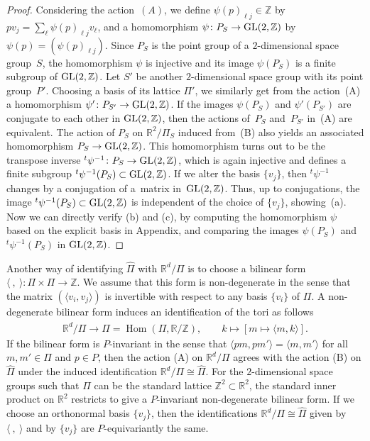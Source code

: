 \documentclass[pdftex]{sigma}
\theoremstyle{definition}
\newcommand{\R}{\mathbb{R}}
\newcommand{\Z}{\mathbb{Z}}
\begin{document}
\begin{proof}Considering the action~$(A)$, we def\/ine $\psi(p)_{\ell j} \in \Z$ by $pv_j = \sum_{\ell} \psi(p)_{\ell j}v_{\ell}$, and a homomorphism $\psi\colon P_S \to {\rm GL}(2, \Z)$ by $\psi(p) = (\psi(p)_{\ell j})$. Since $P_S$ is the point group of a $2$-dimensional space group~$S$, the homomorphism $\psi$ is injective and its image $\psi(P_S)$ is a f\/inite subgroup of ${\rm GL}(2, \Z)$. Let $S'$ be another $2$-dimensional space group with its point group~$P'$. Choosing a basis of its lattice $\Pi'$, we similarly get from the action~(A) a homomorphism $\psi'\colon P_{S'} \to {\rm GL}(2, \Z)$. If the images $\psi(P_S)$ and $\psi'(P_{S'})$ are conjugate to each other in ${\rm GL}(2, \Z)$, then the actions of~$P_S$ and~$P_{S'}$ in~(A) are equivalent. The action of $P_S$ on $\R^2/\Pi_S$ induced from~(B) also yields an associated homomorphism $P_S \to {\rm GL}(2, \Z)$. This homomorphism turns out to be the transpose inverse ${}^t \psi^{-1} \colon P_S \to {\rm GL}(2, \Z)$, which is again injective and def\/ines a f\/inite subgroup ${}^t\psi^{-1}(P_S) \subset {\rm GL}(2, \Z)$. If we alter the basis $\{ v_j \}$, then ${}^t\psi^{-1}$ changes by a conjugation of a~matrix in~${\rm GL}(2, \Z)$. Thus, up to conjugations, the image ${}^t\psi^{-1}(P_S) \subset {\rm GL}(2, \Z)$ is independent of the choice of $\{ v_j \}$, showing~(a). Now we can directly verify (b) and (c), by computing the homomorphism $\psi$ based on the explicit basis in Appendix, and comparing the images $\psi(P_S)$ and ${}^t\psi^{-1}(P_S)$ in ${\rm GL}(2, \Z)$.
\end{proof}

Another way of identifying $\hat{\Pi}$ with $\R^d/\Pi$ is to choose a bilinear form $\langle \ , \ \rangle \colon \Pi \times \Pi \to \Z$. We assume that this form is non-degenerate in the sense that the matrix $(\langle v_i, v_j \rangle)$ is invertible with respect to any basis $\{ v_i \}$ of $\Pi$. A non-degenerate bilinear form induces an identif\/ication of the tori as follows
\begin{gather*}
 \R^d/\Pi \longrightarrow \hat{\Pi} = \operatorname{Hom}(\Pi, \R/\Z), \qquad k \mapsto [m \mapsto \langle m, k \rangle].
\end{gather*}
If the bilinear form is $P$-invariant in the sense that $\langle p m, p m' \rangle = \langle m, m' \rangle$ for all $m, m' \in \Pi$ and $p \in P$, then the action (A) on $\R^d/\Pi$ agrees with the action (B) on $\hat{\Pi}$ under the induced identif\/ication $\R^d/\Pi \cong \hat{\Pi}$. For the $2$-dimensional space groups such that $\Pi$ can be the standard lattice $\Z^2 \subset \R^2$, the standard inner product on $\R^2$ restricts to give a $P$-invariant non-degenerate bilinear form. If we choose an orthonormal basis $\{ v_j \}$, then the identif\/ications $\R^d/\Pi \cong \hat{\Pi}$ given by $\langle \ , \ \rangle$ and by $\{ v_j \}$ are $P$-equivariantly the same.
\end{document}
